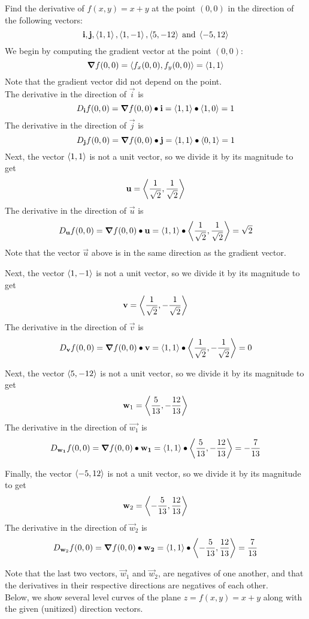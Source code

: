 \documentclass[handout]{ximera}
\begin{document}
\begin{example}[Example 5]
Find the derivative of $f(x,y) = x+y$ at the point $(0,0)$ in the direction of the following vectors:
\[
\mathbf{i}, \mathbf{j}, \left\langle 1,1\right\rangle, \left\langle 1, -1\right\rangle, \left\langle 5, -12\right\rangle \;\text{and} \; \left\langle -5, 12\right\rangle
\]
We begin by computing the gradient vector at the point $(0,0)$:
\[
\boldsymbol\nabla f(0,0) = \left\langle f_x(0,0), f_y(0,0)\right\rangle = \left\langle 1,1\right\rangle
\]
Note that the gradient vector did not depend on the point.\\
The derivative in the direction of $\vec i$ is
\[
D_{\mathbf i} f(0,0) = \boldsymbol\nabla f(0,0) \bullet \mathbf{i} = \left\langle 1,1\right\rangle \bullet \left\langle 1,0\right\rangle = 1
\]
The derivative in the direction of $\vec j$ is
\[
D_{\mathbf j} f(0,0) = \boldsymbol\nabla f(0,0) \bullet \mathbf{j} = \left\langle 1,1\right\rangle \bullet \left\langle 0,1\right\rangle = 1
\]
Next, the vector $\left\langle 1,1\right\rangle$ is not a unit vector, so we divide it by its magnitude to get
\[
\mathbf u = \left\langle \frac{1}{\sqrt 2}, \frac{1}{\sqrt 2}\right\rangle
\]
The derivative in the direction of $\vec u$ is
\[
D_{\mathbf u} f(0,0) = \boldsymbol\nabla f(0,0) \bullet \mathbf{u} = \left\langle 1,1\right\rangle \bullet \left\langle \frac{1}{\sqrt 2}, \frac{1}{\sqrt 2}\right\rangle = \sqrt 2
\]
Note that the vector $\vec u$ above is in the same direction as the gradient vector.

Next, the vector $\left\langle 1,-1\right\rangle$ is not a unit vector, so we divide it by its magnitude to get
\[
\mathbf v = \left\langle \frac{1}{\sqrt 2}, -\frac{1}{\sqrt 2}\right\rangle
\]
The derivative in the direction of $\vec v$ is
\[
D_{\mathbf v} f(0,0) = \boldsymbol\nabla f(0,0) \bullet \mathbf{v} = \left\langle 1,1\right\rangle \bullet \left\langle \frac{1}{\sqrt 2}, -\frac{1}{\sqrt 2}\right\rangle = 0
\]

Next, the vector $\left\langle 5,-12\right\rangle$ is not a unit vector, so we divide it by its magnitude to get
\[
\mathbf w_1 = \left\langle \frac{5}{13}, -\frac{12}{13}\right\rangle
\]
The derivative in the direction of $\vec{w_1}$ is
\[
D_{\mathbf{w_1}} f(0,0) = \boldsymbol\nabla f(0,0) \bullet \mathbf{w_1} = \left\langle 1,1\right\rangle \bullet \left\langle \frac{5}{13}, -\frac{12}{13}\right\rangle = -\frac{7}{13}
\]

Finally, the vector $\left\langle -5,12\right\rangle$ is not a unit vector, so we divide it by its magnitude to get
\[
\mathbf w_2 = \left\langle -\frac{5}{13}, \frac{12}{13}\right\rangle
\]
The derivative in the direction of $\vec w_2$ is
\[
D_{\mathbf w_2} f(0,0) = \boldsymbol\nabla f(0,0) \bullet \mathbf{w_2} = \left\langle 1,1\right\rangle \bullet \left\langle -\frac{5}{13}, \frac{12}{13}\right\rangle = \frac{7}{13}
\]

Note that the last two vectors, $\vec w_1$ and $\vec w_2$, are negatives of one another, and that the 
derivatives in their respective directions are negatives of each other.\\
Below, we show several level curves of the plane $z = f(x,y) = x+y$ along with the given (unitized) direction vectors.


\end{example}
\end{document}
